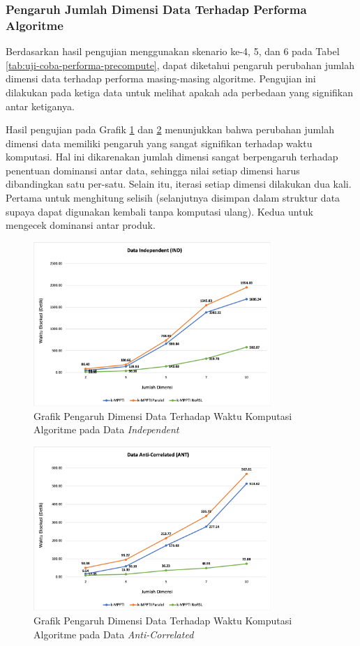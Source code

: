 \subsubsection{Pengaruh Jumlah Dimensi Data Terhadap Performa Algoritme}

\tab Berdasarkan hasil pengujian menggunakan skenario ke-4, 5, dan 6 pada Tabel \ref{tab:uji-coba-performa-precompute}, dapat diketahui pengaruh perubahan jumlah dimensi data terhadap performa masing-masing algoritme. Pengujian ini dilakukan pada ketiga data untuk melihat apakah ada perbedaan yang signifikan antar ketiganya. 

Hasil pengujian pada Grafik \ref{fig:grafik-ind-dim-time} dan \ref{fig:grafik-ant-dim-time} menunjukkan bahwa perubahan jumlah dimensi data memiliki pengaruh yang sangat signifikan terhadap waktu komputasi. Hal ini dikarenakan jumlah dimensi sangat berpengaruh terhadap penentuan dominansi antar data, sehingga nilai setiap dimensi harus dibandingkan satu per-satu. Selain itu, iterasi setiap dimensi dilakukan dua kali. Pertama untuk menghitung selisih (selanjutnya disimpan dalam struktur data supaya dapat digunakan kembali tanpa komputasi ulang). Kedua untuk mengecek dominansi antar produk.

\begin{figure}[H]
	\centering
	\includegraphics[width=9cm]{assets/img/bab5/grafik-ind-dim-time.png}
	\caption{Grafik Pengaruh Dimensi Data Terhadap Waktu Komputasi Algoritme pada Data \textit{Independent}}
	\label{fig:grafik-ind-dim-time}
\end{figure}

\begin{figure}[H]
	\centering
	\includegraphics[width=9cm]{assets/img/bab5/grafik-ant-dim-time.png}
	\caption{Grafik Pengaruh Dimensi Data Terhadap Waktu Komputasi Algoritme pada Data \textit{Anti-Correlated}}
	\label{fig:grafik-ant-dim-time}
\end{figure}


